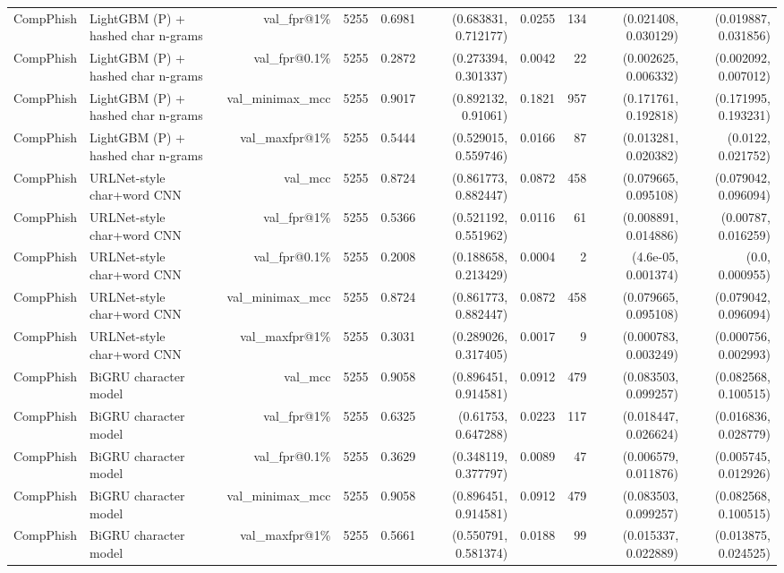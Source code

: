 \begin{table}[t]
\begin{tabular}{llrrrrrrrr}
CompPhish & LightGBM (P) + hashed char n-grams & val\_fpr@1\% & 5255 & 0.6981 & (0.683831, 0.712177) & 0.0255 & 134 & (0.021408, 0.030129) & (0.019887, 0.031856) \\
CompPhish & LightGBM (P) + hashed char n-grams & val\_fpr@0.1\% & 5255 & 0.2872 & (0.273394, 0.301337) & 0.0042 & 22 & (0.002625, 0.006332) & (0.002092, 0.007012) \\
CompPhish & LightGBM (P) + hashed char n-grams & val\_minimax\_mcc & 5255 & 0.9017 & (0.892132, 0.91061) & 0.1821 & 957 & (0.171761, 0.192818) & (0.171995, 0.193231) \\
CompPhish & LightGBM (P) + hashed char n-grams & val\_maxfpr@1\% & 5255 & 0.5444 & (0.529015, 0.559746) & 0.0166 & 87 & (0.013281, 0.020382) & (0.0122, 0.021752) \\
CompPhish & URLNet-style char+word CNN & val\_mcc & 5255 & 0.8724 & (0.861773, 0.882447) & 0.0872 & 458 & (0.079665, 0.095108) & (0.079042, 0.096094) \\
CompPhish & URLNet-style char+word CNN & val\_fpr@1\% & 5255 & 0.5366 & (0.521192, 0.551962) & 0.0116 & 61 & (0.008891, 0.014886) & (0.00787, 0.016259) \\
CompPhish & URLNet-style char+word CNN & val\_fpr@0.1\% & 5255 & 0.2008 & (0.188658, 0.213429) & 0.0004 & 2 & (4.6e-05, 0.001374) & (0.0, 0.000955) \\
CompPhish & URLNet-style char+word CNN & val\_minimax\_mcc & 5255 & 0.8724 & (0.861773, 0.882447) & 0.0872 & 458 & (0.079665, 0.095108) & (0.079042, 0.096094) \\
CompPhish & URLNet-style char+word CNN & val\_maxfpr@1\% & 5255 & 0.3031 & (0.289026, 0.317405) & 0.0017 & 9 & (0.000783, 0.003249) & (0.000756, 0.002993) \\
CompPhish & BiGRU character model & val\_mcc & 5255 & 0.9058 & (0.896451, 0.914581) & 0.0912 & 479 & (0.083503, 0.099257) & (0.082568, 0.100515) \\
CompPhish & BiGRU character model & val\_fpr@1\% & 5255 & 0.6325 & (0.61753, 0.647288) & 0.0223 & 117 & (0.018447, 0.026624) & (0.016836, 0.028779) \\
CompPhish & BiGRU character model & val\_fpr@0.1\% & 5255 & 0.3629 & (0.348119, 0.377797) & 0.0089 & 47 & (0.006579, 0.011876) & (0.005745, 0.012926) \\
CompPhish & BiGRU character model & val\_minimax\_mcc & 5255 & 0.9058 & (0.896451, 0.914581) & 0.0912 & 479 & (0.083503, 0.099257) & (0.082568, 0.100515) \\
CompPhish & BiGRU character model & val\_maxfpr@1\% & 5255 & 0.5661 & (0.550791, 0.581374) & 0.0188 & 99 & (0.015337, 0.022889) & (0.013875, 0.024525) \\

\end{tabular}
\end{table}
